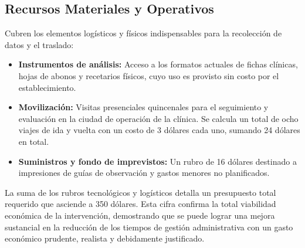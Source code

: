 \subsection{Recursos Materiales y Operativos}
Cubren los elementos logísticos y físicos indispensables para la recolección de datos y el traslado:
\begin{itemize}
    \item \textbf{Instrumentos de análisis:} Acceso a los formatos actuales de fichas clínicas, hojas de abonos y recetarios físicos, cuyo uso es provisto sin costo por el establecimiento.
    \item \textbf{Movilización:} Visitas presenciales quincenales para el seguimiento y evaluación en la ciudad de operación de la clínica. Se calcula un total de ocho viajes de ida y vuelta con un costo de 3 dólares cada uno, sumando 24 dólares en total.
    \item \textbf{Suministros y fondo de imprevistos:} Un rubro de 16 dólares destinado a impresiones de guías de observación y gastos menores no planificados.
\end{itemize}

La suma de los rubros tecnológicos y logísticos detalla un presupuesto total requerido que asciende a 350 dólares. Esta cifra confirma la total viabilidad económica de la intervención, demostrando que se puede lograr una mejora sustancial en la reducción de los tiempos de gestión administrativa con un gasto económico prudente, realista y debidamente justificado.